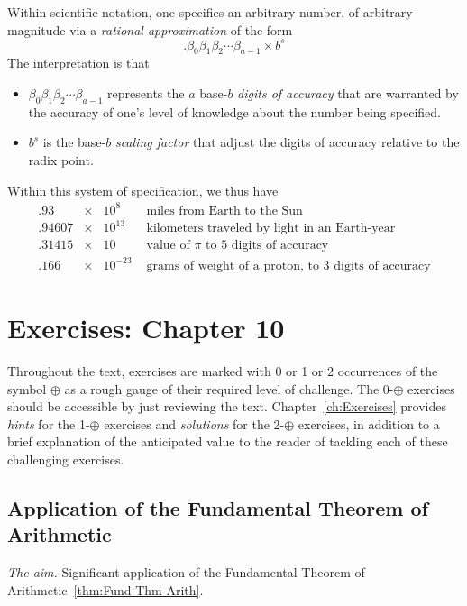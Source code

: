 \medskip

Within scientific notation, one specifies an arbitrary number, of arbitrary magnitude via a {\em rational approximation} of the form
\[ . \beta_0 \beta_1 \beta_2 \cdots \beta_{a-1} \times b^s \]
The interpretation is that
\begin{itemize}
\item
$\beta_0 \beta_1 \beta_2 \cdots \beta_{a-1}$ represents the $a$ base-$b$ {\em digits of accuracy} that are warranted by the accuracy of one's level of knowledge about the number being specified.

\item
$b^s$ is the base-$b$ {\em scaling factor} that adjust the digits of accuracy relative to the radix point.
\end{itemize}
Within this system of specification, we thus have
\[ \begin{array}{lcll}
.93       & \times & 10^8      & \mbox{ miles from Earth to the Sun} \\
.94607 & \times & 10^{13}  & \mbox{ kilometers traveled by light in an Earth-year} \\
.31415 & \times & 10          & \mbox{ value of $\pi$ to $5$ digits of accuracy} \\
.166     & \times & 10^{-23} & \mbox{ grams of weight of a proton, to $3$ digits of accuracy}
\end{array}
\]



\section{Exercises: Chapter 10}

Throughout the text, exercises are marked with 0 or 1 or 2
occurrences of the symbol $\oplus$ as a rough gauge of their required level of
 challenge.  The 0-$\oplus$ exercises should be accessible by just reviewing the
text.  Chapter~\ref{ch:Exercises} provides {\em hints} for the 1-$\oplus$
exercises and {\em solutions} for the 2-$\oplus$ exercises, in addition to a brief
explanation of the anticipated value to the reader of tackling each of these
challenging exercises.

\subsection{Application of the Fundamental Theorem of Arithmetic}

\noindent \textit{The aim.}
Significant application of the Fundamental Theorem of Arithmetic~\ref{thm:Fund-Thm-Arith}.
\medskip

